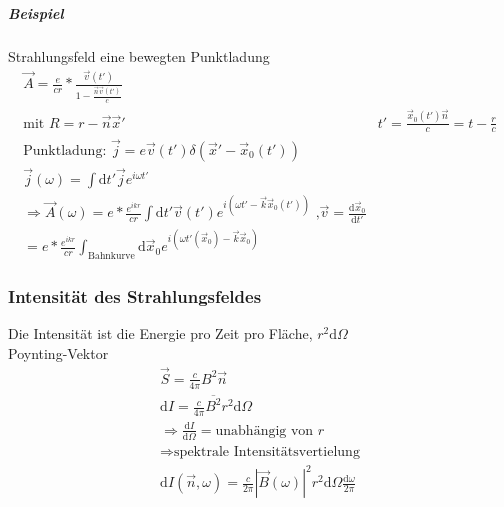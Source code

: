 \documentclass[a4paper]{article}
\begin{document}
\subparagraph{Beispiel}
Strahlungsfeld eine bewegten Punktladung
\begin{align}
\vec{A}=\frac{e}{cr}*\frac{\vec{v}(t')}{1-\frac{\vec{n}\vec{v}(t')}{c}}\\
\text{mit }R=r-\vec{n}\vec{x}' &
t'=\frac{\vec{x}_0(t')\vec{n}}{c}=t-\frac{r}{c}\\
\text{Punktladung: } \vec{j}=e\vec{v}(t')\delta(\vec{x}'-\vec{x}_0(t'))\\
\vec{j}(\omega)=\int \mathrm{d}t' \vec{j} e^{i\omega t'}\\
\Rightarrow \vec{A}(\omega)=e*\frac{e^{ikr}}{cr}\int \mathrm{d}t' \vec{v}(t')e^{i\left(
\omega t'-\vec{k}\vec{x}_0(t') \right)}\text{ ,
}\vec{v}=\frac{\mathrm{d}\vec{x}_0}{\mathrm{d}t'}\\
=e*\frac{e^{ikr}}{cr}\int_{\text{Bahnkurve}} \mathrm{d}\vec{x}_0 e^{i\left(
\omega t'(\vec{x}_0)-\vec{k}\vec{x}_0 \right)}
\end{align}
\subsubsection{Intensität des Strahlungsfeldes}
Die Intensität ist die Energie pro Zeit pro Fläche, $r^2\mathrm{d}\Omega$\\
Poynting-Vektor 
\begin{align}
\vec{S}=\frac{c}{4\pi}B^2\vec{n}\\
\mathrm{d}I=\frac{c}{4\pi}\overline{B^2}r^2\mathrm{d}\Omega\\
\Rightarrow \frac{\mathrm{d}I}{\mathrm{d}\Omega}= \text{unabhängig von }r\\
\Rightarrow \text{spektrale Intensitätsvertielung}\\
\mathrm{d}I(\vec{n},\omega)=\frac{c}{2\pi}|\vec{B}(\omega)|^2r^2\mathrm{d}\Omega
\frac{\mathrm{d}\omega}{2\pi}
\end{align} 
\end{document}
